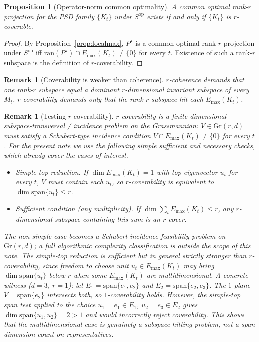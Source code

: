 \documentclass[final,3p,times]{elsarticle}
\newtheorem{proposition}[theorem]{Proposition}
\newtheorem{remark}[theorem]{Remark}
\newcommand{\Gr}{\mathrm{Gr}}
\newcommand{\ran}{\mathrm{ran}}
\newcommand{\Emax}{E_{\max}}
\begin{document}
\begin{proposition}[Operator-norm common optimality]\label{thm:caus}
A common optimal rank-$r$ projection for the PSD family $\{K_t\}$ under
$S^{\mathrm{op}}$ exists if and only if $\{K_t\}$ is $r$-coverable.
\end{proposition}

\begin{proof}
By Proposition~\ref{prop:localmax}, $P^\star$ is a common optimal rank-$r$
projection under $S^{\mathrm{op}}$ iff $\ran(P^\star)\cap\Emax(K_t)\ne\{0\}$
for every $t$.
Existence of such a rank-$r$ subspace is the definition of
$r$-coverability.
\end{proof}

\begin{remark}[Coverability is weaker than coherence]
$r$-coherence demands that one rank-$r$ subspace \emph{equal} a dominant
$r$-dimensional invariant subspace of every $M_t$.
$r$-coverability demands only that the rank-$r$ subspace \emph{hit}
each $\Emax(K_t)$.
\end{remark}

\begin{remark}[Testing $r$-coverability]
\label{rem:covtest}
$r$-coverability is a finite-dimensional subspace-transversal /
incidence problem on the Grassmannian: $V\in\Gr(r,d)$ must satisfy a
Schubert-type incidence condition $V\cap\Emax(K_t)\ne\{0\}$ for every
$t$.
For the present note we use the following simple sufficient and
necessary checks, which already cover the cases of interest.
\begin{itemize}
\item \emph{Simple-top reduction.} If $\dim\Emax(K_t)=1$ with top
eigenvector $u_t$ for every $t$, $V$ must contain each $u_t$, so
$r$-coverability is equivalent to $\dim\mathrm{span}\{u_t\}\le r$.
\item \emph{Sufficient condition (any multiplicity).} If
$\dim\sum_t\Emax(K_t)\le r$, any $r$-dimensional subspace containing
this sum is an $r$-cover.
\end{itemize}
The non-simple case becomes a Schubert-incidence feasibility problem on
$\Gr(r,d)$; a full algorithmic complexity classification is outside the
scope of this note.
The simple-top reduction is sufficient but in general strictly stronger
than $r$-coverability, since freedom to choose unit $u_t\in\Emax(K_t)$
may bring $\dim\mathrm{span}\{u_t\}$ below $r$ when some $\Emax(K_t)$
are multidimensional.
A concrete witness ($d=3$, $r=1$): let
$E_1=\mathrm{span}\{e_1,e_2\}$ and $E_2=\mathrm{span}\{e_2,e_3\}$.
The $1$-plane $V=\mathrm{span}\{e_2\}$ intersects both, so
$1$-coverability holds.
However, the simple-top span test applied to the choice $u_1=e_1\in E_1$,
$u_2=e_3\in E_2$ gives $\dim\mathrm{span}\{u_1,u_2\}=2>1$ and would
incorrectly reject coverability.
This shows that the multidimensional case is genuinely a
subspace-hitting problem, not a span dimension count on representatives.
\end{remark}
\end{document}
